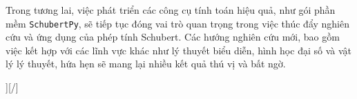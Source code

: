 \documentclass[conference,a4paper]{IEEEtran}
\begin{document}
Trong tương lai, việc phát triển các công cụ tính toán hiệu quả, như gói phần mềm \texttt{SchubertPy}, sẽ tiếp tục đóng vai trò quan trọng trong việc thúc đẩy nghiên cứu và ứng dụng của phép tính Schubert. Các hướng nghiên cứu mới, bao gồm việc kết hợp với các lĩnh vực khác như lý thuyết biểu diễn, hình học đại số và vật lý lý thuyết, hứa hẹn sẽ mang lại nhiều kết quả thú vị và bất ngờ.





\nocite{graysonschubert2}
\nocite{hiep2014schubert3}
\nocite{katz1992schubert}
\nocite{Kontsevich_1994}
\nocite{PythonTyping2023}
\nocite{PythonUnittestLib}
\nocite{SageMath2024}
\nocite{schubert1879kalkul}
\nocite{Hiep2014IntersectionTheory}
\nocite{Van2024BatBienDaiTap}

\vspace{7pt}




\appendix








][/]
\end{document}
